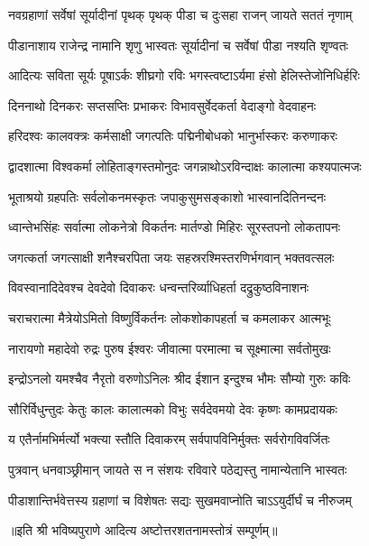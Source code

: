 

\twolineshloka
{नवग्रहाणां सर्वेषां सूर्यादीनां पृथक् पृथक्}
{पीडा च दुःसहा राजन् जायते सततं नृणाम्}

\twolineshloka
{पीडानाशाय राजेन्द्र नामानि शृणु भास्वतः}
{सूर्यादीनां च सर्वेषां पीडा नश्यति शृण्वतः}

\twolineshloka
{आदित्यः सविता सूर्यः पूषाऽर्कः शीघ्रगो रविः}
{भगस्त्वष्टाऽर्यमा हंसो हेलिस्तेजोनिधिर्हरिः}

\twolineshloka
{दिननाथो दिनकरः सप्तसप्तिः प्रभाकरः}
{विभावसुर्वेदकर्ता वेदाङ्गो वेदवाहनः}

\twolineshloka
{हरिदश्वः कालवक्त्रः कर्मसाक्षी जगत्पतिः}
{पद्मिनीबोधको भानुर्भास्करः करुणाकरः}

\twolineshloka
{द्वादशात्मा विश्वकर्मा लोहिताङ्गस्तमोनुदः}
{जगन्नाथोऽरविन्दाक्षः कालात्मा कश्यपात्मजः}

\twolineshloka
{भूताश्रयो ग्रहपतिः सर्वलोकनमस्कृतः}
{जपाकुसुमसङ्काशो भास्वानदितिनन्दनः}

\twolineshloka
{ध्वान्तेभसिंहः सर्वात्मा लोकनेत्रो विकर्तनः}
{मार्तण्डो मिहिरः सूरस्तपनो लोकतापनः}

\twolineshloka
{जगत्कर्ता जगत्साक्षी शनैश्चरपिता जयः}
{सहस्ररश्मिस्तरणिर्भगवान् भक्तवत्सलः}

\twolineshloka
{विवस्वानादिदेवश्च देवदेवो दिवाकरः}
{धन्वन्तरिर्व्याधिहर्ता दद्रुकुष्ठविनाशनः}

\twolineshloka
{चराचरात्मा मैत्रेयोऽमितो विष्णुर्विकर्तनः}
{लोकशोकापहर्ता च कमलाकर आत्मभूः}

\twolineshloka
{नारायणो महादेवो रुद्रः पुरुष ईश्वरः}
{जीवात्मा परमात्मा च सूक्ष्मात्मा सर्वतोमुखः}

\twolineshloka
{इन्द्रोऽनलो यमश्चैव नैरृतो वरुणोऽनिलः}
{श्रीद ईशान इन्दुश्च भौमः सौम्यो गुरुः कविः}

\twolineshloka
{सौरिर्विधुन्तुदः केतुः कालः कालात्मको विभुः}
{सर्वदेवमयो देवः कृष्णः कामप्रदायकः}

\twolineshloka
{य एतैर्नामभिर्मर्त्यो भक्त्या स्तौति दिवाकरम्}
{सर्वपापविनिर्मुक्तः सर्वरोगविवर्जितः}

\twolineshloka
{पुत्रवान् धनवाञ्छ्रीमान् जायते स न संशयः}
{रविवारे पठेद्यस्तु नामान्येतानि भास्वतः}

\twolineshloka
{पीडाशान्तिर्भवेत्तस्य ग्रहाणां च विशेषतः}
{सद्यः सुखमवाप्नोति चाऽऽयुर्दीर्घं च नीरुजम्}

॥इति श्री भविष्यपुराणे आदित्य अष्टोत्तरशतनामस्तोत्रं सम्पूर्णम्॥